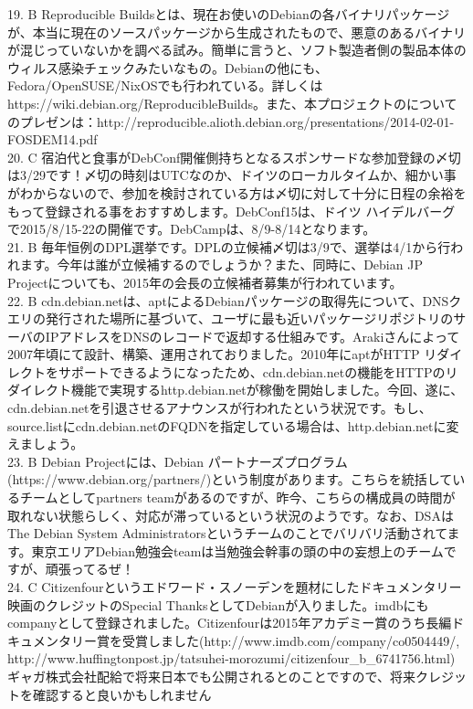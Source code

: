\documentclass[mingoth,a4paper]{jsarticle}
\begin{document}
{19. B Reproducible Buildsとは、現在お使いのDebianの各バイナリパッケージが、本当に現在のソースパッケージから生成されたもので、悪意のあるバイナリが混じっていないかを調べる試み。簡単に言うと、ソフト製造者側の製品本体のウィルス感染チェックみたいなもの。Debianの他にも、Fedora/OpenSUSE/NixOSでも行われている。詳しくは https://wiki.debian.org/ReproducibleBuilds。また、本プロジェクトのについてのプレゼンは：http://reproducible.alioth.debian.org/presentations/2014-02-01-FOSDEM14.pdf\\
20. C 宿泊代と食事がDebConf開催側持ちとなるスポンサードな参加登録の〆切は3/29です！〆切の時刻はUTCなのか、ドイツのローカルタイムか、細かい事がわからないので、参加を検討されている方は〆切に対して十分に日程の余裕をもって登録される事をおすすめします。DebConf15は、ドイツ ハイデルバーグで2015/8/15-22の開催です。DebCampは、8/9-8/14となります。\\
21. B 毎年恒例のDPL選挙です。DPLの立候補〆切は3/9で、選挙は4/1から行われます。今年は誰が立候補するのでしょうか？また、同時に、Debian JP Projectについても、2015年の会長の立候補者募集が行われています。\\
22. B cdn.debian.netは、aptによるDebianパッケージの取得先について、DNSクエリの発行された場所に基づいて、ユーザに最も近いパッケージリポジトリのサーバのIPアドレスをDNSのレコードで返却する仕組みです。Arakiさんによって2007年頃にて設計、構築、運用されておりました。2010年にaptがHTTP リダイレクトをサポートできるようになったため、cdn.debian.netの機能をHTTPのリダイレクト機能で実現するhttp.debian.netが稼働を開始しました。今回、遂に、cdn.debian.netを引退させるアナウンスが行われたという状況です。もし、source.listにcdn.debian.netのFQDNを指定している場合は、http.debian.netに変えましょう。\\
23. B Debian Projectには、Debian パートナーズプログラム(https://www.debian.org/partners/)という制度があります。こちらを統括しているチームとしてpartners teamがあるのですが、昨今、こちらの構成員の時間が取れない状態らしく、対応が滞っているという状況のようです。なお、DSAはThe Debian System Administratorsというチームのことでバリバリ活動されてます。東京エリアDebian勉強会teamは当勉強会幹事の頭の中の妄想上のチームですが、頑張ってるぜ！\\
24. C Citizenfourというエドワード・スノーデンを題材にしたドキュメンタリー映画のクレジットのSpecial ThanksとしてDebianが入りました。imdbにもcompanyとして登録されました。Citizenfourは2015年アカデミー賞のうち長編ドキュメンタリー賞を受賞しました(http://www.imdb.com/company/co0504449/, http://www.huffingtonpost.jp/tatsuhei-morozumi/citizenfour\_b\_6741756.html)ギャガ株式会社配給で将来日本でも公開されるとのことですので、将来クレジットを確認すると良いかもしれません\\
}
\end{document}
